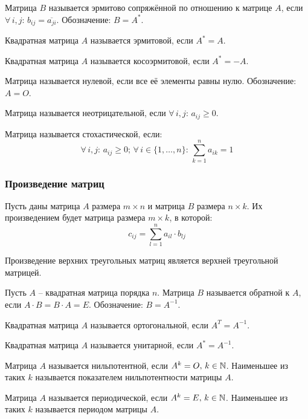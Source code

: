 \documentclass[12pt]{article}
\begin{document}
\begin{definition}
    Матрица $B$ называется эрмитово сопряжённой по отношению к матрице $A$, если $\forall\,i,j:\,b_{ij}=\overline{a_{ji}}$. Обозначение: $B=A^*$.
\end{definition}
\begin{definition}
    Квадратная матрица $A$ называется эрмитовой, если $A^*=A$.
\end{definition}
\begin{definition}
    Квадратная матрица $A$ называется косоэрмитовой, если $A^*=-A$.
\end{definition}
\begin{definition}
    Матрица называется нулевой, если все её элементы равны нулю. Обозначение: $A=O$.
\end{definition}
\begin{definition}
    Матрица называется неотрицательной, если $\forall\,i,j:\,a_{ij}\geq0$.
\end{definition}
\begin{definition}
    Матрица называется стохастической, если:
    $$\forall\,i,j:\,a_{ij}\geq0;\,\forall\,i\in\{1,\ldots,n\}:\,\sum_{k=1}^{n}a_{ik}=1$$
\end{definition}

\subsubsection{Произведение матриц}

\begin{definition}
    Пусть даны матрица $A$ размера $m\times n$ и матрица $B$ размера $n\times k$. Их произведением будет матрица размера $m\times k$, в которой:
    $$c_{ij}=\sum_{l=1}^{n}a_{il}\cdot b_{lj}$$
\end{definition}
\begin{statement}
    Произведение верхних треугольных матриц является верхней треугольной матрицей.
\end{statement}
\begin{definition}
    Пусть $A$ – квадратная матрица порядка $n$. Матрица $B$ называется обратной к $A$, если $A\cdot B=B\cdot A=E$. Обозначение: $B=A^{-1}$.
\end{definition}
\begin{definition}
    Квадратная матрица $A$ называется ортогональной, если $A^T=A^{-1}$.
\end{definition}
\begin{definition}
    Квадратная матрица $A$ называется унитарной, если $A^*=A^{-1}$.
\end{definition}
\begin{definition}
    Матрица $A$ называется нильпотентной, если $A^k=O,\,k\in \mathbb{N}$. Наименьшее из таких $k$ называется показателем нильпотентности матрицы $A$.
\end{definition}
\begin{definition}
    Матрица $A$ называется периодической, если $A^k=E,\,k\in \mathbb{N}$. Наименьшее из таких $k$ называется периодом матрицы $A$.
\end{definition}
\end{document}
